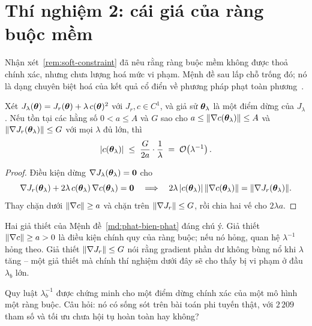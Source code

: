 \section{Thí nghiệm 2: cái giá của ràng buộc mềm}
\label{sec:tn2}
 
Nhận xét~\ref{rem:soft-constraint} đã nêu rằng ràng buộc mềm không được thoả
chính xác, nhưng chưa lượng hoá mức vi phạm. Mệnh đề sau lấp chỗ trống đó; nó là
dạng chuyên biệt hoá của kết quả cổ điển về phương pháp phạt toàn
phương~\cite{nocedal2006}.
 
\begin{menhde}
\label{md:phat-bien-phat}
Xét $J_{\lambda}(\bm{\theta}) = J_r(\bm{\theta}) + \lambda\, c(\bm{\theta})^2$ với
$J_r, c \in C^1$, và giả sử $\bm{\theta}_{\lambda}$ là một điểm dừng của
$J_{\lambda}$. Nếu tồn tại các hằng số $0 < a \le A$ và $G$ sao cho
$a \le \lVert\nabla c(\bm{\theta}_{\lambda})\rVert \le A$ và
$\lVert\nabla J_r(\bm{\theta}_{\lambda})\rVert \le G$ với mọi $\lambda$ đủ lớn, thì
\begin{equation}
\lvert c(\bm{\theta}_{\lambda})\rvert \;\le\; \frac{G}{2a}\cdot\frac{1}{\lambda}
 \;=\; \mathcal{O}\!\left(\lambda^{-1}\right).
\label{eq:phat-bac-nhat}
\end{equation}
\end{menhde}
 
\begin{proof}
Điều kiện dừng $\nabla J_{\lambda}(\bm{\theta}_{\lambda}) = \bm{0}$ cho
\[
\nabla J_r(\bm{\theta}_{\lambda})
 + 2\lambda\, c(\bm{\theta}_{\lambda})\,\nabla c(\bm{\theta}_{\lambda}) = \bm{0}
\quad\Longrightarrow\quad
2\lambda\,\lvert c(\bm{\theta}_{\lambda})\rvert\,\lVert\nabla c(\bm{\theta}_{\lambda})\rVert
 = \lVert\nabla J_r(\bm{\theta}_{\lambda})\rVert .
\]
Thay chặn dưới $\lVert\nabla c\rVert \ge a$ và chặn trên
$\lVert\nabla J_r\rVert \le G$, rồi chia hai vế cho $2\lambda a$.
\end{proof}
 
Hai giả thiết của Mệnh đề~\ref{md:phat-bien-phat} đáng chú ý. Giả thiết
$\lVert\nabla c\rVert \ge a > 0$ là điều kiện chính quy của ràng buộc; nếu nó hỏng,
quan hệ $\lambda^{-1}$ hỏng theo. Giả thiết $\lVert\nabla J_r\rVert \le G$ nói rằng
gradient phần dư không bùng nổ khi $\lambda$ tăng -- một giả thiết mà chính thí
nghiệm dưới đây sẽ cho thấy bị vi phạm ở đầu $\lambda_b$ lớn.
 
\begin{thinghiem}
\label{tn:lambda}
Quy luật $\lambda_b^{-1}$ được chứng minh cho một điểm dừng chính xác của một mô
hình một ràng buộc. Câu hỏi: nó có sống sót trên bài toán phi tuyến thật, với
$2\,209$ tham số và tối ưu chưa hội tụ hoàn toàn hay không?
\end{thinghiem}
 
